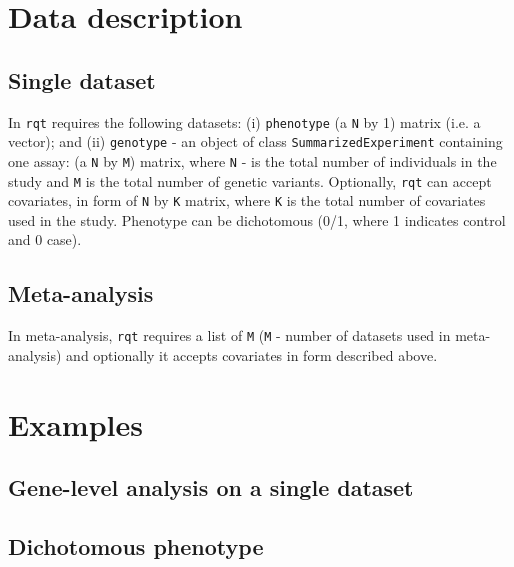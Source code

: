 \documentclass{article}
\begin{document}
\section{Data description}
\subsection{Single dataset}
In \texttt{rqt} requires the following datasets: 
(i) \texttt{phenotype} (a \texttt{N} by 1) matrix (i.e. a vector); 
and (ii) \texttt{genotype} - an object of class 
\texttt{SummarizedExperiment} containing one assay:
(a \texttt{N} by \texttt{M}) matrix, where 
\texttt{N} - is the total 
number of individuals in the study and \texttt{M} is the total number 
of genetic variants. Optionally, \texttt{rqt} can accept covariates, 
in form of \texttt{N} by \texttt{K} matrix, where \texttt{K} 
is the total number of 
covariates used in the study. Phenotype can be dichotomous 
(0/1, where 1 indicates control and 0 case).

\subsection{Meta-analysis}
In meta-analysis, \texttt{rqt} requires a list of \texttt{M} 
(\texttt{M} - number 
of datasets used in meta-analysis) and optionally it accepts
covariates in form described above.

\section{Examples}

\subsection{Gene-level analysis on a single dataset}
\subsection{Dichotomous phenotype}
\end{document}
